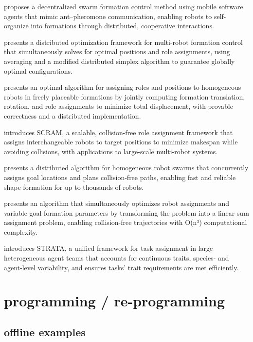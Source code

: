 \cite{kambayashi2018distributed} proposes a decentralized swarm formation control method using mobile software agents that mimic ant–pheromone communication, enabling robots to self-organize into formations through distributed, cooperative interactions.

\cite{montijano2014efficient} presents a distributed optimization framework for multi-robot formation control that simultaneously solves for optimal positions and role assignments, using averaging and a modified distributed simplex algorithm to guarantee globally optimal configurations.

\cite{mosteo2017optimal} presents an optimal algorithm for assigning roles and positions to homogeneous robots in freely placeable formations by jointly computing formation translation, rotation, and role assignments to minimize total displacement, with provable correctness and a distributed implementation.

\cite{macalpine2015scram} introduces SCRAM, a scalable, collision-free role assignment framework that assigns interchangeable robots to target positions to minimize makespan while avoiding collisions, with applications to large-scale multi-robot systems.

\cite{wang2020shape} presents a distributed algorithm for homogeneous robot swarms that concurrently assigns goal locations and plans collision-free paths, enabling fast and reliable shape formation for up to thousands of robots.

\cite{agarwal2018simultaneous} presents an algorithm that simultaneously optimizes robot assignments and variable goal formation parameters by transforming the problem into a linear sum assignment problem, enabling collision-free trajectories with O(n³) computational complexity.

\cite{ravichandar2020strata} introduces STRATA, a unified framework for task assignment in large heterogeneous agent teams that accounts for continuous traits, species- and agent-level variability, and ensures tasks' trait requirements are met efficiently.

\section{programming / re-programming}

\subsection {offline examples}

